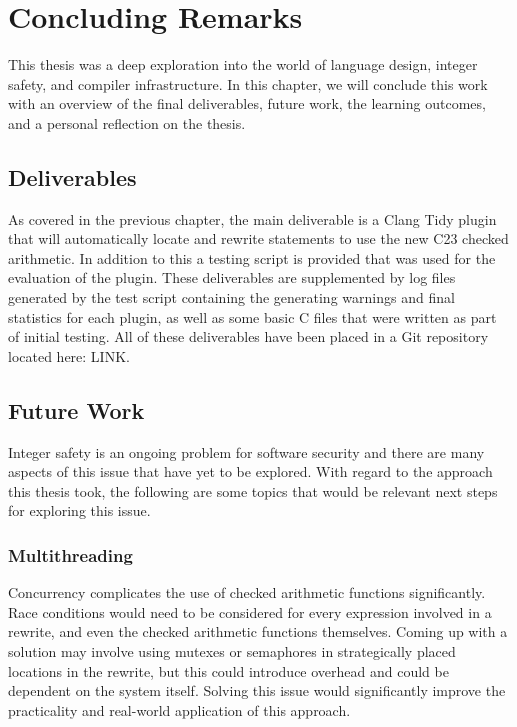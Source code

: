 \chapter{Concluding Remarks}
\label{sec:conclusion}

This thesis was a deep exploration into the world of language design, integer safety, and compiler infrastructure. In this chapter, we will conclude this work with an overview of the final deliverables, future work, the learning outcomes, and a personal reflection on the thesis.

\section{Deliverables}

As covered in the previous chapter, the main deliverable is a Clang Tidy plugin that will automatically locate and rewrite statements to use the new C23 checked arithmetic. In addition to this a testing script is provided that was used for the evaluation of the plugin. These deliverables are supplemented by log files generated by the test script containing the generating warnings and final statistics for each plugin, as well as some basic C files that were written as part of initial testing. All of these deliverables have been placed in a Git repository located here: LINK.

\section{Future Work}

Integer safety is an ongoing problem for software security and there are many aspects of this issue that have yet to be explored. With regard to the approach this thesis took, the following are some topics that would be relevant next steps for exploring this issue.

\subsection{Multithreading}

Concurrency complicates the use of checked arithmetic functions significantly. Race conditions would need to be considered for every expression involved in a rewrite, and even the checked arithmetic functions themselves. Coming up with a solution may involve using mutexes or semaphores in strategically placed locations in the rewrite, but this could introduce overhead and could be dependent on the system itself. Solving this issue would significantly improve the practicality and real-world application of this approach.

